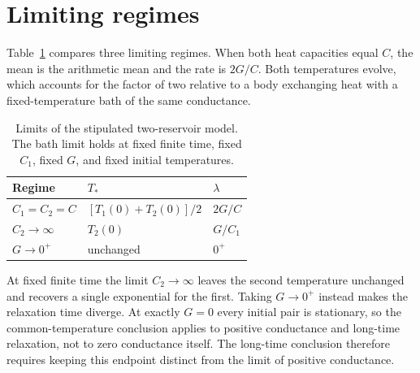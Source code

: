 \section{Limiting regimes}
Table~\ref{tab:limits} compares three limiting regimes. When both heat capacities equal $C$, the mean is the arithmetic mean and the rate is $2G/C$. Both temperatures evolve, which accounts for the factor of two relative to a body exchanging heat with a fixed-temperature bath of the same conductance.

\begin{table}[ht]
\caption{Limits of the stipulated two-reservoir model. The bath limit holds at fixed finite time, fixed $C_1$, fixed $G$, and fixed initial temperatures.}\label{tab:limits}
\begin{ruledtabular}
\begin{tabular}{lll}
Regime & $T_*$ & $\lambda$ \\
\hline
$C_1=C_2=C$ & $[T_1(0)+T_2(0)]/2$ & $2G/C$ \\
$C_2\to\infty$ & $T_2(0)$ & $G/C_1$ \\
$G\to0^+$ & unchanged & $0^+$
\end{tabular}
\end{ruledtabular}
\end{table}

At fixed finite time the limit $C_2\to\infty$ leaves the second temperature unchanged and recovers a single exponential for the first. Taking $G\to0^+$ instead makes the relaxation time diverge. At exactly $G=0$ every initial pair is stationary, so the common-temperature conclusion applies to positive conductance and long-time relaxation, not to zero conductance itself. The long-time conclusion therefore requires keeping this endpoint distinct from the limit of positive conductance.
